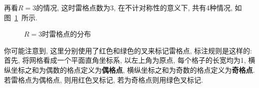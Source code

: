 \documentclass{ctexart}
\newcommand{\redcross}[2]{
    \begin{scope}[thick,color = red,shift={(#1,#2)}]
        \draw (0.05,-0.05) -- (-0.05,0.05);
        \draw (-0.05,-0.05) -- (0.05,0.05);
    \end{scope}
}
\newcommand{\greencross}[2]{
    \begin{scope}[thick,color = green,shift={(#1,#2)}]
        \draw (0.05,-0.05) -- (-0.05,0.05);
        \draw (-0.05,-0.05) -- (0.05,0.05);
    \end{scope}
}
\begin{document}
再看$R = 3$的情况, 这时雷格点数为3, 在不计对称性的意义下, 共有4种情况, 如图\ \ref{example3}\ 所示.
\begin{figure}[ht]
    \caption{$R=3$时雷格点的分布}
    \label{example3}
\end{figure}

你可能注意到, 这里分别使用了红色和绿色的叉来标记雷格点, 标注规则是这样的: 首先, 将网格看成一个平面直角坐标系, 以左上角为原点, 每个格子的长宽均为1, 横纵坐标之和为偶数的格点定义为\textbf{偶格点}, 横纵坐标之和为奇数的格点定义为\textbf{奇格点}. 若雷格点为偶格点, 则用红色叉标记, 若为奇格点则用绿色叉标记.
\end{document}
